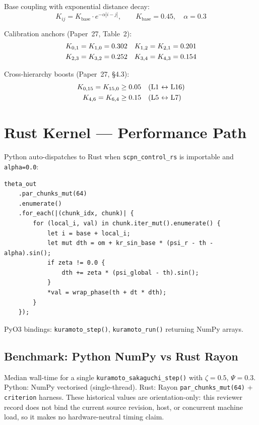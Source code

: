 \documentclass[11pt,a4paper]{article}
\begin{document}
Base coupling with exponential distance decay:
\begin{equation}
  K_{ij} = K_{\text{base}} \cdot e^{-\alpha|i-j|}, \qquad
  K_{\text{base}} = 0.45,\quad \alpha = 0.3
\end{equation}

Calibration anchors (Paper~27, Table~2):
\begin{align}
  K_{0,1} = K_{1,0} &= 0.302 &
  K_{1,2} = K_{2,1} &= 0.201 \notag\\
  K_{2,3} = K_{3,2} &= 0.252 &
  K_{3,4} = K_{4,3} &= 0.154
\end{align}

Cross-hierarchy boosts (Paper~27, \S4.3):
\begin{align}
  K_{0,15} = K_{15,0} &\geq 0.05 & &\text{(L1 $\leftrightarrow$ L16)} \notag\\
  K_{4,6}  = K_{6,4}  &\geq 0.15 & &\text{(L5 $\leftrightarrow$ L7)}
\end{align}


\section{Rust Kernel --- Performance Path}

Python auto-dispatches to Rust when \texttt{scpn\_control\_rs} is importable
and \texttt{alpha=0.0}:

\begin{lstlisting}[caption={Rayon-parallelised Kuramoto hot loop (Rust).}]
theta_out
    .par_chunks_mut(64)
    .enumerate()
    .for_each(|(chunk_idx, chunk)| {
        for (local_i, val) in chunk.iter_mut().enumerate() {
            let i = base + local_i;
            let mut dth = om + kr_sin_base * (psi_r - th - alpha).sin();
            if zeta != 0.0 {
                dth += zeta * (psi_global - th).sin();
            }
            *val = wrap_phase(th + dt * dth);
        }
    });
\end{lstlisting}

PyO3 bindings: \texttt{kuramoto\_step()}, \texttt{kuramoto\_run()} returning
NumPy arrays.

\subsection{Benchmark: Python NumPy vs Rust Rayon}

Median wall-time for a single \texttt{kuramoto\_sakaguchi\_step()} with
$\zeta=0.5$, $\Psi=0.3$.  Python: NumPy vectorised (single-thread).
Rust: Rayon \texttt{par\_chunks\_mut(64)} + \texttt{criterion} harness.
These historical values are orientation-only: this reviewer record does not
bind the current source revision, host, or concurrent machine load, so it makes
no hardware-neutral timing claim.
\end{document}
